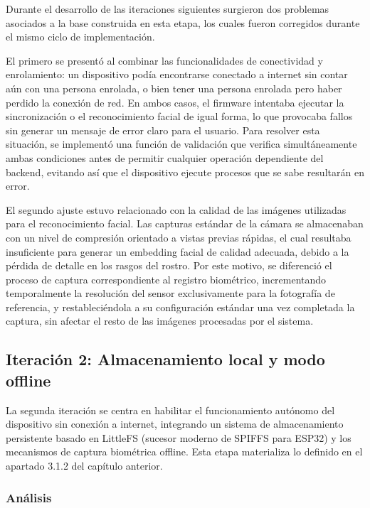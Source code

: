 Durante el desarrollo de las iteraciones siguientes surgieron dos problemas asociados a la base construida en esta etapa, los cuales fueron corregidos durante el mismo ciclo de implementación.

El primero se presentó al combinar las funcionalidades de conectividad y enrolamiento: un dispositivo podía encontrarse conectado a internet sin contar aún con una persona enrolada, o bien tener una persona enrolada pero haber perdido la conexión de red. En ambos casos, el firmware intentaba ejecutar la sincronización o el reconocimiento facial de igual forma, lo que provocaba fallos sin generar un mensaje de error claro para el usuario. Para resolver esta situación, se implementó una función de validación que verifica simultáneamente ambas condiciones antes de permitir cualquier operación dependiente del backend, evitando así que el dispositivo ejecute procesos que se sabe resultarán en error.

El segundo ajuste estuvo relacionado con la calidad de las imágenes utilizadas para el reconocimiento facial. Las capturas estándar de la cámara se almacenaban con un nivel de compresión orientado a vistas previas rápidas, el cual resultaba insuficiente para generar un embedding facial de calidad adecuada, debido a la pérdida de detalle en los rasgos del rostro. Por este motivo, se diferenció el proceso de captura correspondiente al registro biométrico, incrementando temporalmente la resolución del sensor exclusivamente para la fotografía de referencia, y restableciéndola a su configuración estándar una vez completada la captura, sin afectar el resto de las imágenes procesadas por el sistema.


\subsection{Iteración 2: Almacenamiento local y modo offline}

La segunda iteración se centra en habilitar el funcionamiento autónomo del dispositivo sin conexión a internet, integrando un sistema de almacenamiento persistente basado en LittleFS (sucesor moderno de SPIFFS para ESP32) y los mecanismos de captura biométrica offline. Esta etapa materializa lo definido en el apartado 3.1.2 del capítulo anterior.

\subsubsection{Análisis}

